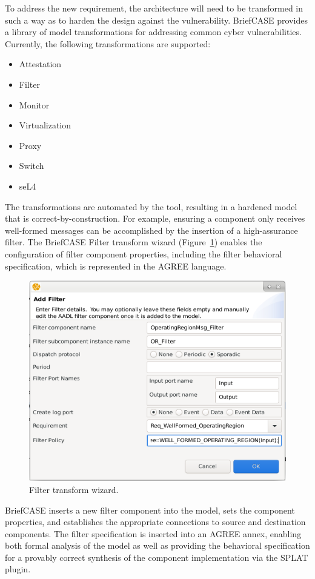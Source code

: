 To address the new requirement, the architecture will need to be transformed in such a way as to harden the design against the vulnerability.
BriefCASE provides a library of model transformations for addressing common cyber vulnerabilities.  Currently, the following transformations are supported:

\begin{itemize}
	\item Attestation
	\item Filter
	\item Monitor
	\item Virtualization
	\item Proxy
	\item Switch
	\item seL4
\end{itemize}  

The transformations are automated by the tool, resulting in a hardened model that is correct-by-construction.  
For example, ensuring a component only receives well-formed messages can be accomplished by the insertion of a high-assurance filter.  The BriefCASE Filter transform wizard (Figure~\ref{fig:filter-wiz}) enables the configuration of filter component properties, including the filter behavioral specification, which is represented in the AGREE language.

\begin{figure}[h]
	\centering
	\includegraphics[width=0.7\columnwidth]{figs/filter-wiz.png}
	\caption{Filter transform wizard.} 
	\label{fig:filter-wiz} 
\end{figure}

BriefCASE inserts a new filter component into the model, sets the component properties, and establishes the appropriate connections to source and destination components. The filter specification is inserted into an AGREE annex, enabling both formal analysis of the model as well as providing the behavioral specification for a provably correct synthesis of the component implementation via the SPLAT plugin.

